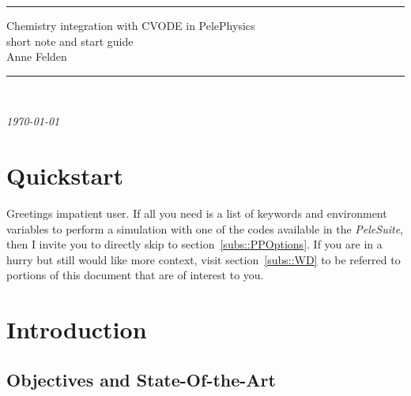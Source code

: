 \documentclass[12pt]{article}
\begin{document}
\vspace*{1 cm}
\vskip5cm

\begin{center}

\rule{\textwidth}{1pt}
\LARGE{Chemistry integration with CVODE in PelePhysics} \\ \Large{short note and start guide} \\
\vskip5mm
\Large{Anne Felden  }

\rule{\textwidth}{1pt}\\

\vskip10mm

\large{\textit{\today}}
\end{center}

\newpage
\tableofcontents
\newpage
\section{Quickstart}
{\color{red} Greetings impatient user. If all you need is a list of keywords and environment variables to perform a simulation with one of the codes available in the \textit{PeleSuite}, then I invite you to directly skip to section~\ref{subs::PPOptions}. If you are in a hurry but still would like more context, visit section~\ref{subs::WD} to be referred to portions of this document that are of interest to you.}


\section{Introduction}


\subsection{Objectives and State-Of-the-Art}
\end{document}
